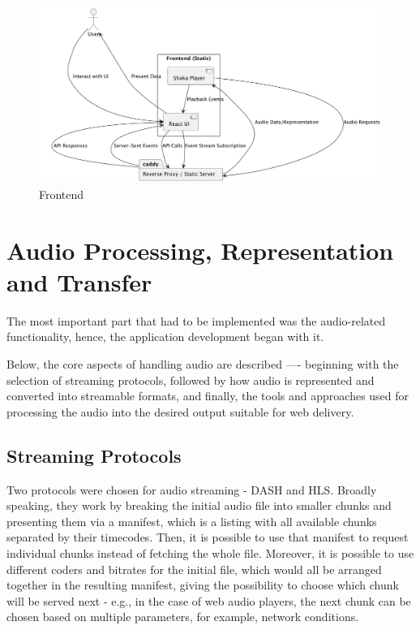 \begin{figure}[htbp]
    \centering
    \includegraphics[width=1\textwidth, keepaspectratio]{diagrams/frontend.png}
    \caption{Frontend}
    \label{fig:Frontend}
\end{figure}


\section{Audio Processing, Representation and Transfer}
The most important part that had to be implemented was the audio-related functionality,
hence, the application development began with it.

Below, the core aspects of handling audio are described —-
beginning with the selection of streaming protocols,
followed by how audio is represented and converted into streamable formats,
and finally, the tools and approaches used for processing the audio into the desired
output suitable for web delivery.

\subsection{Streaming Protocols}
Two protocols were chosen for audio streaming - DASH\cite{dash} and HLS\cite{hls}.
Broadly speaking, they work by breaking the initial audio file into smaller chunks and presenting them via a manifest,
which is a listing with all available chunks separated by their timecodes. Then, it is possible to use that manifest
to request individual chunks instead of fetching the whole file. Moreover, it is possible to use
different coders and bitrates for the initial file, which would all be arranged together in the resulting manifest, giving
the possibility to choose which chunk will be served next - e.g., in the case of web audio players, the next chunk can
be chosen based on multiple parameters, for example, network conditions.

